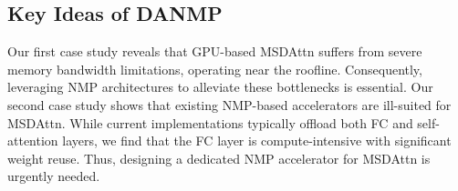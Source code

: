 \documentclass[sigconf]{acmart}
\begin{document}
\subsection{Key Ideas of DANMP}
\label{key_idea}


Our first case study reveals that GPU-based MSDAttn suffers from severe memory bandwidth limitations, operating near the roofline. Consequently, leveraging NMP architectures to alleviate these bottlenecks is essential. Our second case study shows that existing NMP-based accelerators are ill-suited for MSDAttn. While current implementations typically offload both FC and self-attention layers, we find that the FC layer is compute-intensive with significant weight reuse. Thus, designing a dedicated NMP accelerator for MSDAttn is urgently needed.


\end{document}
